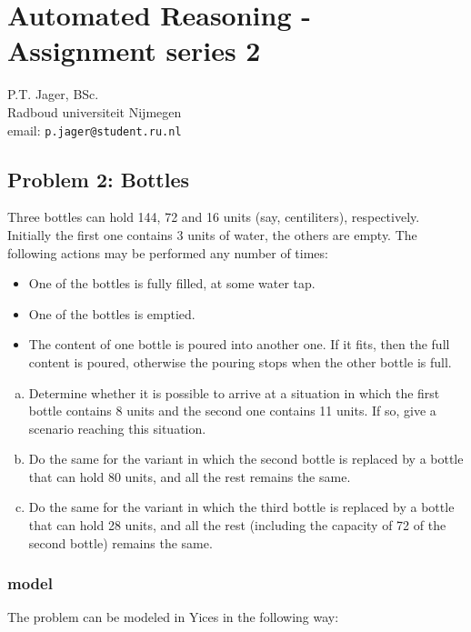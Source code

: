 \documentclass[12pt]{article}
\begin{document}
\section*{Automated Reasoning - Assignment series 2 }

\begin{center}
P.T. Jager, BSc. \\
Radboud universiteit Nijmegen\\
email: {\tt p.jager@student.ru.nl}
\end{center}

\subsection*{Problem 2: Bottles}

Three bottles can hold 144, 72 and 16 units (say, centiliters), respectively.
Initially the first one contains 3 units of water, the others are empty. 
The following actions may be performed any number of times:

\begin{itemize}
	\item One of the bottles is fully filled, at some water tap.
	\item One of the bottles is emptied.
	\item The content of one bottle is poured into another one. If it fits, 
			then the full content is poured, otherwise the pouring stops when 
			the other bottle is full.
\end{itemize}

\begin{enumerate}[(a)]
	\item Determine whether it is possible to arrive at a situation in which 
	the first bottle contains 8 units and the second one contains 11 units. If 
	so, give a scenario reaching this situation.
	\item Do the same for the variant in which the second bottle is replaced by 
	a bottle that can hold 80 units, and all the rest remains the same.
	\item Do the same for the variant in which the third bottle is replaced by a
	bottle that can hold 28 units, and all the rest (including the capacity of 
	72 of the second bottle) remains the same.
\end{enumerate}

\subsubsection*{model}
The problem can be modeled in Yices in the following way:
\end{document}
